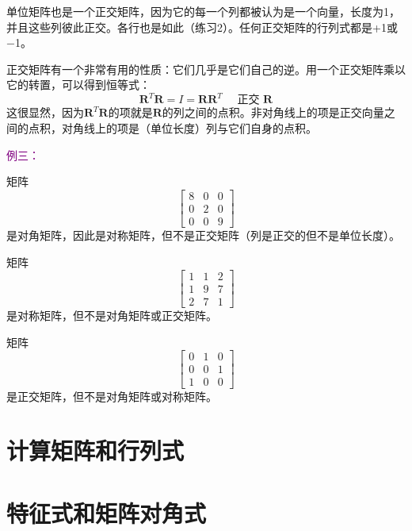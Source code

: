 单位矩阵也是一个正交矩阵，因为它的每一个列都被认为是一个向量，长度为1，并且这些列彼此正交。各行也是如此（练习2）。任何正交矩阵的行列式都是+1或−1。

正交矩阵有一个非常有用的性质：它们几乎是它们自己的逆。用一个正交矩阵乘以它的转置，可以得到恒等式：
\[
\mathbf{R}^T \mathbf{R}=I=\mathbf{R} \mathbf{R}^T \quad \text { 正交 } \mathbf{R}
\]
这很显然，因为$\mathbf{R}^T \mathbf{R}$的项就是$\mathbf{R}$的列之间的点积。非对角线上的项是正交向量之间的点积，对角线上的项是（单位长度）列与它们自身的点积。

\textcolor{purple}{例三：}

矩阵
\[
  \left[\begin{array}{lll}
      8 & 0 & 0 \\
      0 & 2 & 0 \\
      0 & 0 & 9
    \end{array}\right]
\]
是对角矩阵，因此是对称矩阵，但不是正交矩阵（列是正交的但不是单位长度）。

矩阵
\[
  \left[\begin{array}{lll}
      1 & 1 & 2 \\
      1 & 9 & 7 \\
      2 & 7 & 1
    \end{array}\right]
\]是对称矩阵，但不是对角矩阵或正交矩阵。

矩阵
\[
  \left[\begin{array}{lll}
      0 & 1 & 0 \\
      0 & 0 & 1 \\
      1 & 0 & 0
    \end{array}\right]
\]
是正交矩阵，但不是对角矩阵或对称矩阵。

\section{计算矩阵和行列式}
\section{特征式和矩阵对角式}
